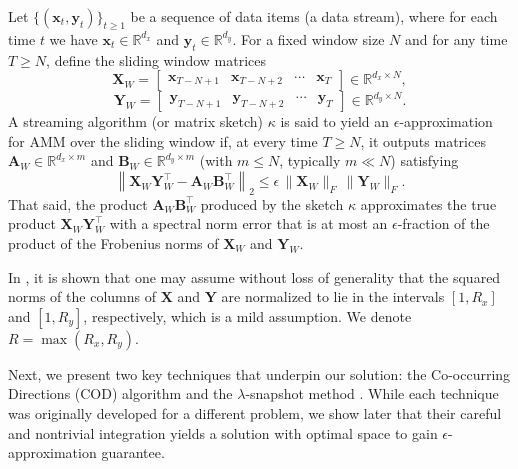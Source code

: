 \vspace{-1mm}
\begin{definition}\label{def:amm}
Let \(\{(\boldsymbol{x}_t, \boldsymbol{y}_t)\}_{t \ge 1}\) be a sequence of data items (a data stream), where for each time \(t\) we have \(\boldsymbol{x}_t \in \mathbb{R}^{d_x}\) and \(\boldsymbol{y}_t \in \mathbb{R}^{d_y}\). For a fixed window size \(N\) and for any time \(T \ge N\), define the sliding window matrices
\[
\boldsymbol{X}_W = \begin{bmatrix} \boldsymbol{x}_{T-N+1} & \boldsymbol{x}_{T-N+2} & \cdots & \boldsymbol{x}_T \end{bmatrix} \in \mathbb{R}^{d_x \times N},\]
\[
\boldsymbol{Y}_W = \begin{bmatrix} \boldsymbol{y}_{T-N+1} & \boldsymbol{y}_{T-N+2} & \cdots & \boldsymbol{y}_T \end{bmatrix} \in \mathbb{R}^{d_y \times N}.
\]
A streaming algorithm (or matrix sketch) \(\kappa\) is said to yield an \(\epsilon\)-approximation for AMM over the sliding window if, at every time \(T \ge N\), it outputs matrices \(\boldsymbol{A}_W \in \mathbb{R}^{d_x \times m}\) and \(\boldsymbol{B}_W \in \mathbb{R}^{d_y \times m}\) (with \(m \le N\), typically \(m \ll N\)) satisfying
\[
\left\|\boldsymbol{X}_W \boldsymbol{Y}_W^\top - \boldsymbol{A}_W \boldsymbol{B}_W^\top\right\|_2 \le \epsilon\, \|\boldsymbol{X}_W\|_F \, \|\boldsymbol{Y}_W\|_F.
\]
That said, the product \(\boldsymbol{A}_W \boldsymbol{B}_W^\top\) produced by the sketch \(\kappa\) approximates the true product \(\boldsymbol{X}_W \boldsymbol{Y}_W^\top\) with a spectral norm error that is at most an \(\epsilon\)-fraction of the product of the Frobenius norms of \(\boldsymbol{X}_W\) and \(\boldsymbol{Y}_W\).
\end{definition}
\vspace{-1mm}



In \cite{WeiLLSDW16}, it is shown that one may assume without loss of generality that the squared norms of the columns of \(\boldsymbol{X}\) and \(\boldsymbol{Y}\) are normalized to lie in the intervals \([1, R_x]\) and \([1, R_y]\), respectively, which is a mild assumption. We denote \(R = \max(R_x, R_y)\).







Next, we present two key techniques that underpin our solution: the Co-occurring Directions (COD) algorithm \cite{MrouehMG17} and the \(\lambda\)-snapshot method \cite{LeeT06}. While each technique was originally developed for a different problem, we show later that their careful and nontrivial integration yields a solution with optimal space to gain $\epsilon$-approximation guarantee.




